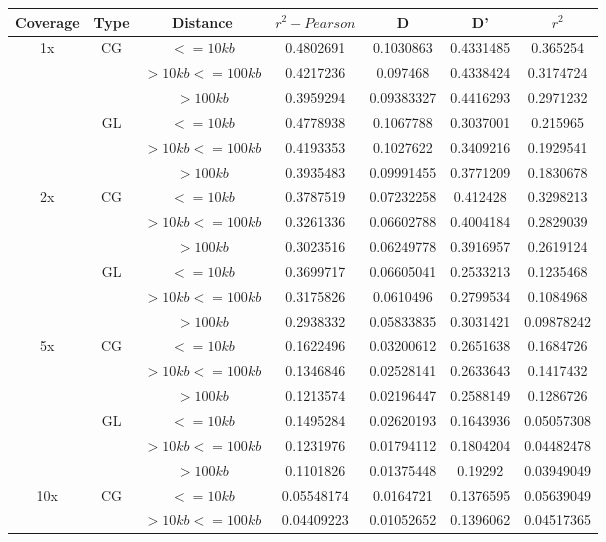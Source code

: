 \documentclass[a4paper]{article}
\begin{document}
\begin{table}[H]
\centering
\begin{tabular}{c|c|c|c|c|c|c}
Coverage & Type & Distance & $r^2 - Pearson$ & D & D' & $r^2$ \\
\hline
\multirow{6}{*}{1x} & \multirow{3}{*}{CG} & $<=10kb$ & 0.4802691 & 0.1030863 & 0.4331485 & 0.365254 \\
& & $>10kb <=100kb$ & 0.4217236 & 0.097468 & 0.4338424 & 0.3174724 \\
& & $>100kb$ & 0.3959294 & 0.09383327 & 0.4416293 & 0.2971232 \\
\cline{2-7}
& \multirow{3}{*}{GL} & $<=10kb$ & 0.4778938 & 0.1067788 & 0.3037001 & 0.215965 \\
& & $>10kb <=100kb$ & 0.4193353 & 0.1027622 & 0.3409216 & 0.1929541 \\
& & $>100kb$ & 0.3935483 & 0.09991455 & 0.3771209 & 0.1830678 \\
\hline
\multirow{6}{*}{2x} & \multirow{3}{*}{CG} & $<=10kb$ & 0.3787519 & 0.07232258 & 0.412428 & 0.3298213 \\
& & $>10kb <=100kb$ & 0.3261336 & 0.06602788 & 0.4004184 & 0.2829039 \\
& & $>100kb$ & 0.3023516 & 0.06249778 & 0.3916957 & 0.2619124 \\
\cline{2-7}
& \multirow{3}{*}{GL} & $<=10kb$ & 0.3699717 & 0.06605041 & 0.2533213 & 0.1235468 \\
& & $>10kb <=100kb$ & 0.3175826 & 0.0610496 & 0.2799534 & 0.1084968 \\
& & $>100kb$ & 0.2938332 & 0.05833835 & 0.3031421 & 0.09878242 \\
\hline
\multirow{6}{*}{5x} & \multirow{3}{*}{CG} & $<=10kb$ & 0.1622496 & 0.03200612 & 0.2651638 & 0.1684726 \\
& & $>10kb <=100kb$ & 0.1346846 & 0.02528141 & 0.2633643 & 0.1417432 \\
& & $>100kb$ & 0.1213574 & 0.02196447 & 0.2588149 & 0.1286726 \\
\cline{2-7}
& \multirow{3}{*}{GL} & $<=10kb$ & 0.1495284 & 0.02620193 & 0.1643936 & 0.05057308 \\
& & $>10kb <=100kb$ & 0.1231976 & 0.01794112 & 0.1804204 & 0.04482478 \\
& & $>100kb$ & 0.1101826 & 0.01375448 & 0.19292 & 0.03949049 \\
\hline
\multirow{6}{*}{10x} & \multirow{3}{*}{CG} & $<=10kb$ & 0.05548174 & 0.0164721 & 0.1376595 & 0.05639049 \\
& & $>10kb <=100kb$ & 0.04409223 & 0.01052652 & 0.1396062 & 0.04517365 \\

\end{tabular}
\end{table}
\end{document}
